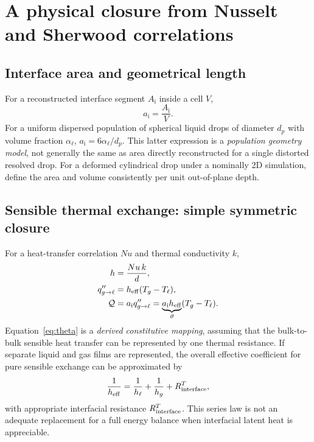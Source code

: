 \documentclass[11pt,letterpaper]{article}
\newcommand{\mi}{\mathrm{i}}
\newcommand{\area}{a_\mi}
\newcommand{\qcal}{\mathcal{Q}}
\begin{document}
\section{A physical closure from Nusselt and Sherwood correlations}
\subsection{Interface area and geometrical length}
For a reconstructed interface segment $A_\mi$ inside a cell $V$,
\begin{equation}\label{eq:a}
\area=\frac{A_\mi}{V}.
\end{equation}
For a uniform dispersed population of spherical liquid drops of diameter $d_p$ with volume fraction $\alpha_\ell$, $\area=6\alpha_\ell/d_p$. This latter expression is a \emph{population geometry model}, not generally the same as area directly reconstructed for a single distorted resolved drop. For a deformed cylindrical drop under a nominally 2D simulation, define the area and volume consistently per unit out-of-plane depth.

\subsection{Sensible thermal exchange: simple symmetric closure}
For a heat-transfer correlation $Nu$ and thermal conductivity $k$,
\begin{align}
h &= \frac{Nu\,k}{d},\label{eq:hnu}\\
q''_{g\to\ell}&=h_{\rm eff}(T_g-T_\ell),\\
\qcal&=\area q''_{g\to\ell}
=\underbrace{\area h_{\rm eff}}_{\vartheta}(T_g-T_\ell).\label{eq:theta}
\end{align}
Equation~\eqref{eq:theta} is a \emph{derived constitutive mapping}, assuming that the bulk-to-bulk sensible heat transfer can be represented by one thermal resistance. If separate liquid and gas films are represented, the overall effective coefficient for pure sensible exchange can be approximated by
\begin{equation}\label{eq:series}
\frac{1}{h_{\rm eff}}=\frac{1}{h_\ell}+\frac{1}{h_g}+R_{\rm interface}^{T},
\end{equation}
with appropriate interfacial resistance $R_{\rm interface}^{T}$. This series law is not an adequate replacement for a full energy balance when interfacial latent heat is appreciable.
\end{document}
